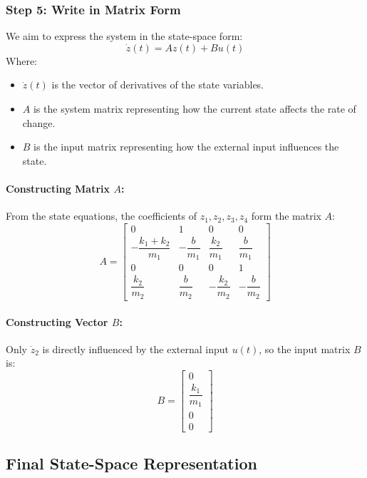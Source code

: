 \documentclass[12pt]{article}
\begin{document}
\subsubsection*{Step 5: Write in Matrix Form}

We aim to express the system in the state-space form:
\[
\dot{z}(t) = A z(t) + B u(t)
\]
Where:
\begin{itemize}
    \item \( \dot{z}(t) \) is the vector of derivatives of the state variables.
    \item \( A \) is the system matrix representing how the current state affects the rate of change.
    \item \( B \) is the input matrix representing how the external input influences the state.
\end{itemize}

\paragraph{Constructing Matrix \( A \):}

From the state equations, the coefficients of \( z_1, z_2, z_3, z_4 \) form the matrix \( A \):
\[
A = \begin{bmatrix}
0 & 1 & 0 & 0 \\
-\dfrac{k_1 + k_2}{m_1} & -\dfrac{b}{m_1} & \dfrac{k_2}{m_1} & \dfrac{b}{m_1} \\
0 & 0 & 0 & 1 \\
\dfrac{k_2}{m_2} & \dfrac{b}{m_2} & -\dfrac{k_2}{m_2} & -\dfrac{b}{m_2}
\end{bmatrix}
\]

\paragraph{Constructing Vector \( B \):}

Only \( \dot{z}_2 \) is directly influenced by the external input \( u(t) \), so the input matrix \( B \) is:
\[
B = \begin{bmatrix}
0 \\
\dfrac{k_1}{m_1} \\
0 \\
0
\end{bmatrix}
\]

\subsection*{Final State-Space Representation}
\end{document}
